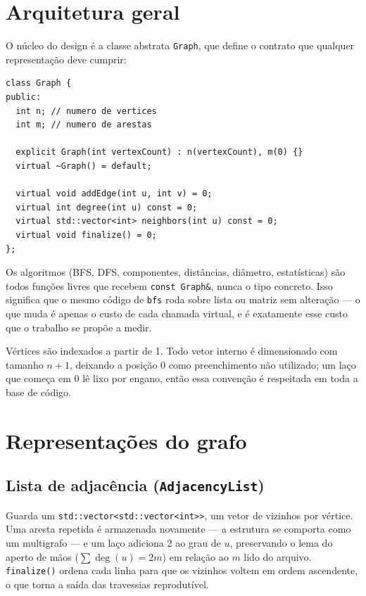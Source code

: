 \documentclass[a4paper,11pt]{article}
\begin{document}
\section{Arquitetura geral}

O núcleo do design é a classe abstrata \texttt{Graph}, que define o
contrato que qualquer representação deve cumprir:

\begin{lstlisting}
class Graph {
public:
  int n; // numero de vertices
  int m; // numero de arestas

  explicit Graph(int vertexCount) : n(vertexCount), m(0) {}
  virtual ~Graph() = default;

  virtual void addEdge(int u, int v) = 0;
  virtual int degree(int u) const = 0;
  virtual std::vector<int> neighbors(int u) const = 0;
  virtual void finalize() = 0;
};
\end{lstlisting}

Os algoritmos (BFS, DFS, componentes, distâncias, diâmetro, estatísticas)
são todos funções livres que recebem \texttt{const Graph\&}, nunca o tipo
concreto. Isso significa que o mesmo código de \texttt{bfs} roda sobre
lista ou matriz sem alteração --- o que muda é apenas o custo de cada
chamada virtual, e é exatamente esse custo que o trabalho se propõe a
medir.

Vértices são indexados a partir de 1. Todo vetor interno é dimensionado
com tamanho $n+1$, deixando a posição 0 como preenchimento não utilizado;
um laço que começa em 0 lê lixo por engano, então essa convenção é
respeitada em toda a base de código.

\section{Representações do grafo}

\subsection{Lista de adjacência (\texttt{AdjacencyList})}

Guarda um \texttt{std::vector<std::vector<int>>}, um vetor de vizinhos por
vértice. Uma aresta repetida é armazenada novamente --- a estrutura se
comporta como um multigrafo --- e um laço adiciona 2 ao grau de \(u\),
preservando o lema do aperto de mãos ($\sum \deg(u) = 2m$) em relação ao
$m$ lido do arquivo. \texttt{finalize()} ordena cada linha para que os
vizinhos voltem em ordem ascendente, o que torna a saída das travessias
reprodutível.
\end{document}
